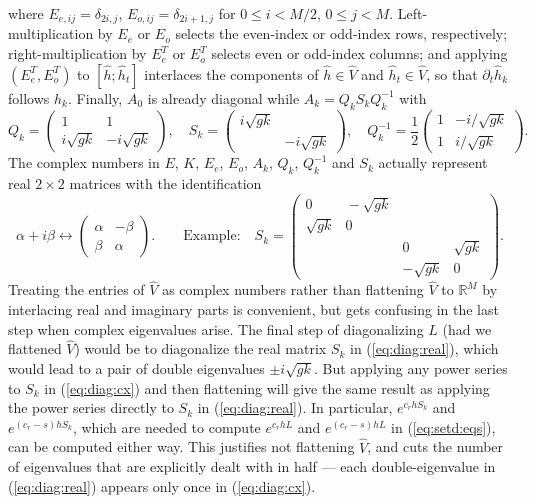 \documentclass[11pt]{article}
\theoremstyle{plain}
\theoremstyle{definition}
\theoremstyle{definition}
\newcommand{\pa}{\partial}
\newcommand{\mat}[1]{\begin{pmatrix} #1 \end{pmatrix}}
\def\bbR{{\mathbb R}}
\begin{document}
%
where  $E_{e,ij} = \delta_{2i,j}$, $E_{o,ij} =
\delta_{2i+1,j}$ for $0\le i<M/2$, $0\le j<M$.  Left-multiplication
  by $E_e$ or $E_o$ selects the even-index or odd-index rows,
  respectively; right-multiplication by $E_e^T$ or $E_o^T$ selects
  even or odd-index columns; and applying $(E_e^T,E_o^T)$ to $[\hat h;\hat
    h_t]$ interlaces the components of $\hat h\in\hat V$ and $\hat h_t\in\hat V$,
  so that $\pa_t\hat h_k$ follows $\hat h_k$. Finally,
$A_0$ is already diagonal while $A_k=Q_kS_kQ_k^{-1}$ with
%
\begin{equation}\label{eq:diag:cx}
   Q_k = \mat{ 1 & 1 \\ i\sqrt{gk} & -i\sqrt{gk} }, \quad
  S_k = \mat{ i\sqrt{gk} \\ & -i\sqrt{gk} }, \quad
  Q_k^{-1} = \frac12\mat{1 & -i/\sqrt{gk} \\ 1 & i/\sqrt{gk} }.
\end{equation}
%
The complex numbers in $E$, $K$, $E_e$, $E_o$, $A_k$, $Q_k$,
$Q_k^{-1}$ and $S_k$ actually represent real $2\times2$
matrices with the identification
%
\begin{equation}\label{eq:diag:real}
  \alpha+i\beta \longleftrightarrow
  \mat{ \alpha & -\beta \\ \beta & \alpha }. \qquad \text{Example:} \quad
  S_k = \mat{ 0 & \!-\sqrt{gk} \\ \sqrt{gk} & 0 \\ & & 0 & \sqrt{gk} \\ & & -\sqrt{gk} & 0 }.
\end{equation}
%
Treating the entries of $\hat V$ as complex numbers rather than
flattening $\hat V$ to $\bbR^M$ by interlacing real and imaginary
parts is convenient, but gets confusing in the last step when
complex eigenvalues arise. The final step of diagonalizing $L$ (had we
  flattened $\hat V$) would be to diagonalize the real matrix $S_k$ in
(\ref{eq:diag:real}), which would lead to a pair of double eigenvalues
$\pm i\sqrt{gk}$. But applying any power series to $S_k$ in
(\ref{eq:diag:cx}) and then flattening will give the same result as
applying the power series directly to $S_k$ in
(\ref{eq:diag:real}). In particular, $e^{c_rhS_k}$ and
$e^{(c_r-s)hS_k}$, which are needed to compute $e^{c_rhL}$ and
$e^{(c_r-s)hL}$ in (\ref{eq:setd:eqs}), can be computed either
way. This justifies not flattening $\hat V$, and cuts the number of
eigenvalues that are explicitly dealt with in half --- each
double-eigenvalue in (\ref{eq:diag:real}) appears only once in
(\ref{eq:diag:cx}).
\end{document}
